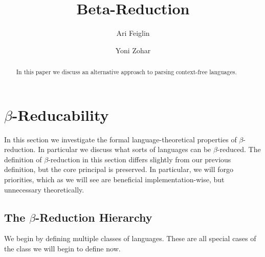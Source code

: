 \documentclass{llncs}
\begin{document}
\title{Beta-Reduction}
\author{Ari Feiglin\and Yoni Zohar}

\maketitle

\begin{abstract}

    In this paper we discuss an alternative approach to parsing context-free languages.

\end{abstract}

\section{$\beta$-Reducability}

In this section we investigate the formal language-theoretical properties of $\beta$-reduction.
In particular we discuss what sorts of languages can be $\beta$-reduced.
The definition of $\beta$-reduction in this section differs slightly from our previous definition, but the core principal
is preserved.
In particular, we will forgo priorities, which as we will see are beneficial implementation-wise, but unnecessary theoretically.

\subsection{The $\beta$-Reduction Hierarchy}

We begin by defining multiple classes of languages.
These are all special cases of the class we will begin to define now.
\end{document}
